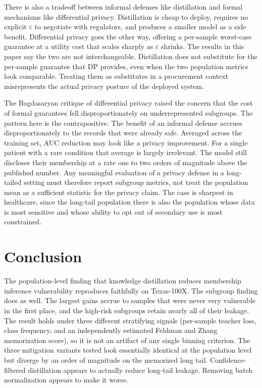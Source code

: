 \documentclass[conference]{IEEEtran}
\begin{document}
There is also a tradeoff between informal defenses like distillation and formal mechanisms like differential privacy. Distillation is cheap to deploy, requires no explicit $\varepsilon$ to negotiate with regulators, and produces a smaller model as a side benefit. Differential privacy goes the other way, offering a per-sample worst-case guarantee at a utility cost that scales sharply as $\varepsilon$ shrinks. The results in this paper say the two are not interchangeable. Distillation does not substitute for the per-sample guarantee that DP provides, even when the two population metrics look comparable. Treating them as substitutes in a procurement context misrepresents the actual privacy posture of the deployed system.

The Bagdasaryan critique of differential privacy raised the concern that the cost of formal guarantees fell disproportionately on underrepresented subgroups. The pattern here is the contrapositive. The benefit of an informal defense accrues disproportionately to the records that were already safe. Averaged across the training set, AUC reduction may look like a privacy improvement. For a single patient with a rare condition that average is largely irrelevant. The model still discloses their membership at a rate one to two orders of magnitude above the published number. Any meaningful evaluation of a privacy defense in a long-tailed setting must therefore report subgroup metrics, not treat the population mean as a sufficient statistic for the privacy claim. The case is sharpest in healthcare, since the long-tail population there is also the population whose data is most sensitive and whose ability to opt out of secondary use is most constrained.

\section*{Conclusion}

The population-level finding that knowledge distillation reduces membership inference vulnerability reproduces faithfully on Texas-100X. The subgroup finding does as well. The largest gains accrue to samples that were never very vulnerable in the first place, and the high-risk subgroups retain nearly all of their leakage. The result holds under three different stratifying signals (per-sample teacher loss, class frequency, and an independently estimated Feldman and Zhang memorization score), so it is not an artifact of any single binning criterion. The three mitigation variants tested look essentially identical at the population level but diverge by an order of magnitude on the memorized long tail. Confidence-filtered distillation appears to actually reduce long-tail leakage. Removing batch normalization appears to make it worse.
\end{document}
